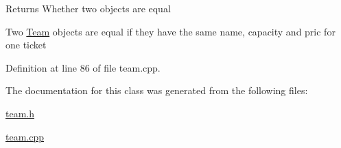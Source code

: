 \begin{DoxyReturn}{Returns}
Whether two objects are equal
\end{DoxyReturn}
Two \hyperlink{class_team}{Team} objects are equal if they have the same name, capacity and pric for one ticket 

Definition at line 86 of file team.\-cpp.



The documentation for this class was generated from the following files\-:\begin{DoxyCompactItemize}
\item 
\hyperlink{team_8h}{team.\-h}\item 
\hyperlink{team_8cpp}{team.\-cpp}\end{DoxyCompactItemize}
